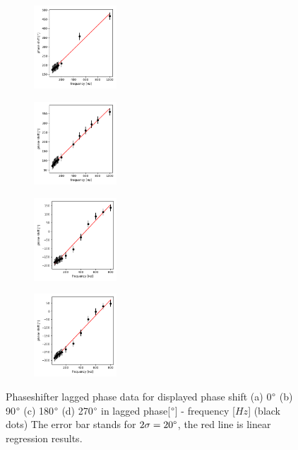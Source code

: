 \documentclass{article}
\begin{document}
 
 \begin{figure}[ht]
    \begin{subfigure}[b]{3.1cm}
        \centering
        \includegraphics[width=3.1cm]{../results/phaseshifter_phase_freq_plot(phase0).png}
        \caption{}
    \end{subfigure}
    \hfill
    \begin{subfigure}[b]{3.1cm}
      \centering
      \includegraphics[width=3.1cm]{../results/phaseshifter_phase_freq_plot(phase90).png}
      \caption{}
  \end{subfigure}
  \hfill
  \begin{subfigure}[b]{3.1cm}
    \centering
    \includegraphics[width=3.1cm]{../results/phaseshifter_phase_freq_plot(phase180).png}
    \caption{}
  \end{subfigure}
  \hfill
  \begin{subfigure}[b]{3.1cm}
    \centering
    \includegraphics[width=3.1cm]{../results/phaseshifter_phase_freq_plot(phase270).png}
    \caption{}
  \end{subfigure}
  \hfill
    \caption{Phaseshifter lagged phase data for displayed phase shift (a) 0$\degree$ (b) 90$\degree$ (c) 180$\degree$ (d) 270$\degree$ in lagged phase[$\degree$] - frequency [$Hz$] (black dots)
        The error bar stands for $2\sigma = 20\degree$, the red line is linear regression results.
     }
    \label{fig: phaseshifter_phase_plot}
  \end{figure}
\end{document}
